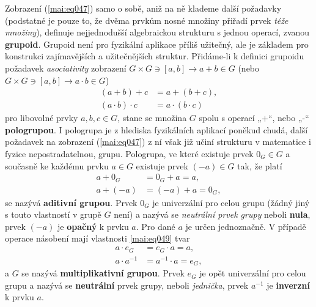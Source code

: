         Zobrazení (\ref{mai:eq047}) samo o sobě, aniž na ně klademe další požadavky (podstatné je 
        pouze to, že dvěma prvkům nosné množiny přiřadí prvek \emph{téže množiny}), definuje 
        nejjednodušší algebraickou strukturu s jednou operací, zvanou \textbf{grupoid}. Grupoid 
        není pro fyzikální aplikace příliš užitečný, ale je základem pro konstrukci zajímavějších a 
        užitečnějších struktur. Přidáme-li k definici grupoidu požadavek \emph{asociativity} 
        zobrazení \(G \times G \ni [a, b] \longrightarrow a + b \in G\) (nebo \(G \times G \ni [a, 
        b] \longrightarrow a \cdot b \in G\))
        \begin{subequations}\label{mai:eq048}
          \begin{align}
            (a+b) + c          &= a + (b + c),                                  \label{mai:eq048a}\\
            (a\cdot b) \cdot c &= a \cdot (b \cdot c)                           \label{mai:eq048b} 
          \end{align}
        \end{subequations}
        pro libovolné prvky \(a, b, c \in G\), stane se množina \(G\) spolu s operací „\(+\)“, nebo 
        „-“ \textbf{pologrupou}. I pologrupa je z hlediska fyzikálních aplikací poněkud chudá, 
        další požadavek na zobrazení (\ref{mai:eq047}) z ní však již učiní strukturu v matematice i 
        fyzice nepostradatelnou, grupu. Pologrupa, ve které existuje prvek \(0_G\in G\) a současně 
        ke každému prvku \(a \in G\) existuje prvek \((-a) \in G\) tak, že platí
        \begin{subequations}\label{mai:eq049}
          \begin{align}
            a + 0_G  &= 0_G + a = a,                                            \label{mai:eq049a}\\ 
            a + (-a) &= (-a) + a = 0_G,                                         \label{mai:eq049b}
          \end{align}
        \end{subequations}
        se nazývá \textbf{aditivní grupou}. Prvek \(0_G\) je univerzální pro celou grupu (žádný 
        jiný s touto vlastností v grupě \(G\) není) a nazývá se \emph{neutrální prvek grupy} neboli 
        \textbf{nula}, prvek \((-a)\) je \textbf{opačný} k prvku \(a\). Pro dané \(a\) je určen 
        jednoznačně. V případě operace násobení mají vlastnosti \ref{mai:eq049} tvar
        \begin{subequations}\label{mai:eq050}
          \begin{align}
            a \cdot e_G    &= e_G    \cdot a = a,                       \label{mai:eq050a}\\
            a \cdot a^{-1} &= a^{-1} \cdot a = e_G,                     \label{mai:eq050b}
          \end{align}
        \end{subequations}
        a \(G\) se nazývá \textbf{multiplikativní grupou}. Prvek \(e_G\) je opět univerzální pro 
        celou grupu a nazývá se \textbf{neutrální} prvek grupy, neboli \emph{jednička}, prvek 
        \(a^{-1}\) je \textbf{inverzní} k prvku \(a\).
        

